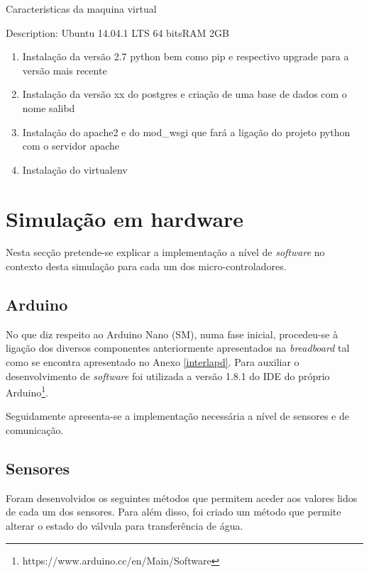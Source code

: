 Caracteristicas da maquina virtual

Description:	Ubuntu 14.04.1 LTS
64 bitsRAM 2GB 


\begin{enumerate}
	\item Instalação da versão 2.7 python bem como pip e respectivo upgrade para a versão mais recente
	\item Instalação da versão xx do postgres e criação de uma base de dados com o nome salibd
	\item Instalação do apache2 e do mod\_wsgi que fará a ligação do projeto python com o servidor apache
	\item Instalação do virtualenv 
\end{enumerate}





\newpage
\section{Simulação em hardware}

Nesta secção pretende-se explicar a implementação a nível de \textit{software} no contexto desta simulação para cada um dos micro-controladores. 


\subsection{Arduino}

No que diz respeito ao Arduino Nano (\ac{SM}), numa fase inicial,  procedeu-se à ligação dos diversos componentes anteriormente apresentados na \textit{breadboard} tal como se encontra apresentado no Anexo \ref{interlapd}. Para auxiliar o desenvolvimento de \textit{software} foi utilizada a versão 1.8.1 do \ac{IDE} do próprio Arduino\footnote{https://www.arduino.cc/en/Main/Software}.  

Seguidamente apresenta-se a implementação necessária a nível de sensores e de comunicação. 

\subsection{Sensores}



Foram desenvolvidos os seguintes métodos que permitem aceder aos valores lidos de cada um dos sensores. Para além disso, foi criado um método que permite alterar o estado do válvula para transferência de água. 

